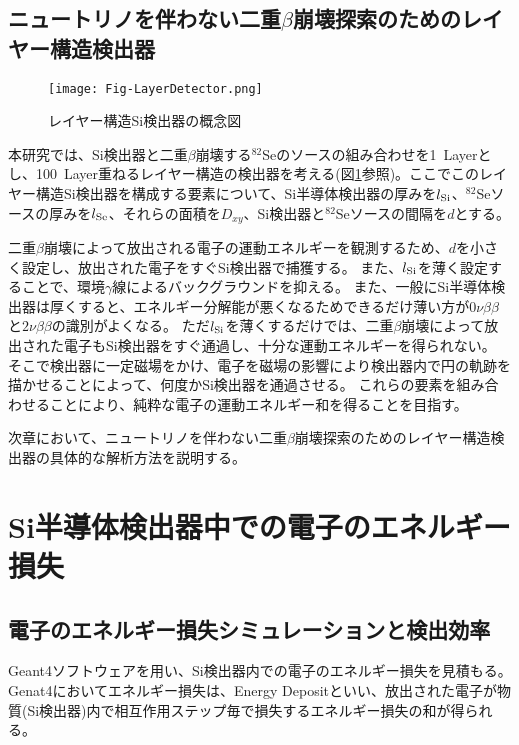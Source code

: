 \documentclass[a4paper,10pt]{jreport}
\begin{document}
\section{ニュートリノを伴わない二重$\beta$崩壊探索のためのレイヤー構造検出器}

\begin{figure}[H]
	\center
	\texttt{[image: Fig-LayerDetector.png]}
	\caption{レイヤー構造Si検出器の概念図} \label{Fig-LayerDetector}
\end{figure}

本研究では、Si検出器と二重$\beta$崩壊する$^{82}$Seのソースの組み合わせを\SI{1}{Layer}とし、\SI{100}{Layer}重ねるレイヤー構造の検出器を考える(図\ref{Fig-LayerDetector}参照)。ここでこのレイヤー構造Si検出器を構成する要素について、Si半導体検出器の厚みを$l_{\rm{Si}}$、$^{82}$Seソースの厚みを$l_{\rm{Se}}$、それらの面積を$D_{xy}$、Si検出器と$^{82}$Seソースの間隔を$d$とする。

二重$\beta$崩壊によって放出される電子の運動エネルギーを観測するため、$d$を小さく設定し、放出された電子をすぐSi検出器で捕獲する。
また、$l_{\rm{Si}}$を薄く設定することで、環境$\gamma$線によるバックグラウンドを抑える。
また、一般にSi半導体検出器は厚くすると、エネルギー分解能が悪くなるためできるだけ薄い方が$0\nu\beta\beta$と$2\nu\beta\beta$の識別がよくなる。
ただ$l_{\rm{Si}}$を薄くするだけでは、二重$\beta$崩壊によって放出された電子もSi検出器をすぐ通過し、十分な運動エネルギーを得られない。
そこで検出器に一定磁場をかけ、電子を磁場の影響により検出器内で円の軌跡を描かせることによって、何度かSi検出器を通過させる。
これらの要素を組み合わせることにより、純粋な電子の運動エネルギー和を得ることを目指す。

次章において、ニュートリノを伴わない二重$\beta$崩壊探索のためのレイヤー構造検出器の具体的な解析方法を説明する。



\chapter{Si半導体検出器中での電子のエネルギー損失}



\section{電子のエネルギー損失シミュレーションと検出効率}

Geant4ソフトウェアを用い、Si検出器内での電子のエネルギー損失を見積もる。
Genat4においてエネルギー損失は、Energy Depositといい、放出された電子が物質(Si検出器)内で相互作用ステップ毎で損失するエネルギー損失の和が得られる。
\end{document}
